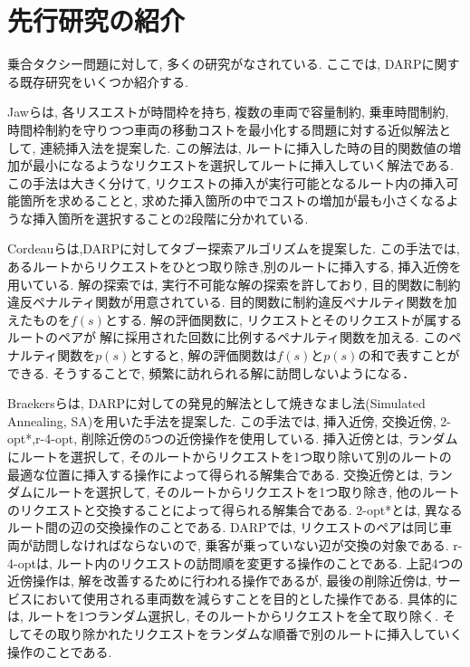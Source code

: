\chapter{先行研究の紹介}\label{previous_research}
乗合タクシー問題に対して, 多くの研究がなされている. ここでは, DARPに関する既存研究をいくつか紹介する.

Jawらは, 各リスエストが時間枠を持ち, 複数の車両で容量制約, 乗車時間制約, 時間枠制約を守りつつ車両の移動コストを最小化する問題に対する近似解法として, 連続挿入法を提案した\cite{insertion}. この解法は, ルートに挿入した時の目的関数値の増加が最小になるようなリクエストを選択してルートに挿入していく解法である. この手法は大きく分けて, リクエストの挿入が実行可能となるルート内の挿入可能箇所を求めることと, 求めた挿入箇所の中でコストの増加が最も小さくなるような挿入箇所を選択することの2段階に分かれている.

Cordeauらは,DARPに対してタブー探索アルゴリズムを提案した\cite{tabu}. この手法では, あるルートからリクエストをひとつ取り除き,別のルートに挿入する, 挿入近傍を用いている. 解の探索では, 実行不可能な解の探索を許しており, 目的関数に制約違反ペナルティ関数が用意されている. 目的関数に制約違反ペナルティ関数を加えたものを$f(s)$とする. 解の評価関数に, リクエストとそのリクエストが属するルートのペアが解に採用された回数に比例するペナルティ関数を加える. このペナルティ関数を$p(s)$とすると, 解の評価関数は$f(s)とp(s)$の和で表すことができる. そうすることで, 頻繁に訪れられる解に訪問しないようになる．

Braekersらは, DARPに対しての発見的解法として焼きなまし法(Simulated Annealing, SA)を用いた手法を提案した\cite{SA}. この手法では, 挿入近傍, 交換近傍, 2-opt*,r-4-opt, 削除近傍の5つの近傍操作を使用している.
挿入近傍とは, ランダムにルートを選択して, そのルートからリクエストを1つ取り除いて別のルートの最適な位置に挿入する操作によって得られる解集合である.
交換近傍とは, ランダムにルートを選択して, そのルートからリクエストを1つ取り除き, 他のルートのリクエストと交換することによって得られる解集合である.
2-opt*とは, 異なるルート間の辺の交換操作のことである.  DARPでは, リクエストのペアは同じ車両が訪問しなければならないので, 乗客が乗っていない辺が交換の対象である.
r-4-optは, ルート内のリクエストの訪問順を変更する操作のことである.
上記4つの近傍操作は, 解を改善するために行われる操作であるが, 最後の削除近傍は, サービスにおいて使用される車両数を減らすことを目的とした操作である. 具体的には, ルートを1つランダム選択し, そのルートからリクエストを全て取り除く. そしてその取り除かれたリクエストをランダムな順番で別のルートに挿入していく操作のことである.

